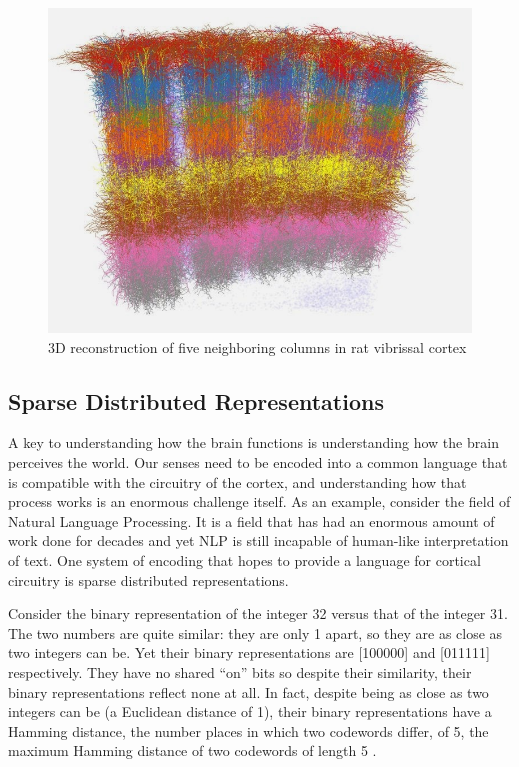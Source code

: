\documentclass[oneside,12pt,openany]{book}
\begin{document}
	\begin{figure}[hbt!]
		\centering
		\includegraphics[width=.6\linewidth]{images/CorticalColumns.jpg}
		\caption[3D reconstruction of five neighboring columns in rat vibrissal cortex]{3D reconstruction of five neighboring columns in rat vibrissal cortex\footnotemark}
		\label{CorticalColumn}
	\end{figure}
	
	\subsection{Sparse Distributed Representations}\label{sec:sdr}
	
	A key to understanding how the brain functions is understanding how the brain perceives the world. Our senses need to be encoded into a common language that is compatible with the circuitry of the cortex, and understanding how that process works is an enormous challenge itself. As an example, consider the field of Natural Language Processing. It is a field that has had an enormous amount of work done for decades and yet NLP is still incapable of human-like interpretation of text. One system of encoding that hopes to provide a language for cortical circuitry is sparse distributed representations.
	
	Consider the binary representation of the integer 32 versus that of the integer 31. The two numbers are quite similar: they are only 1 apart, so they are as close as two integers can be. Yet their binary representations are [100000] and [011111] respectively. They have no shared ``on'' bits so despite their similarity, their binary representations reflect none at all. In fact, despite being as close as two integers can be (a Euclidean distance of 1), their binary representations have a Hamming distance, the number places in which two codewords differ, of 5, the maximum Hamming distance of two codewords of length 5 \cite{Adams}. 
	
\end{document}
